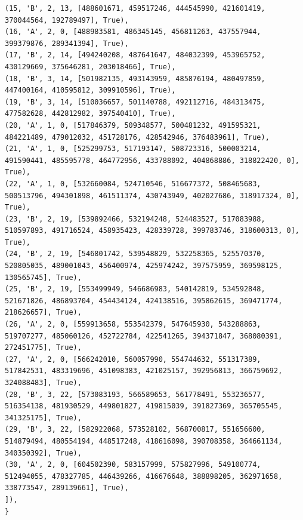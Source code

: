 \documentclass[11pt,reqno]{amsart}
\numberwithin{equation}{section}
\theoremstyle{definition}
\begin{document}
\begin{lstlisting}
(15, 'B', 2, 13, [488601671, 459517246, 444545990, 421601419, 370044564, 192789497], True),
(16, 'A', 2, 0, [488983581, 486345145, 456811263, 437557944, 399379876, 289341394], True),
(17, 'B', 2, 14, [494240208, 487641647, 484032399, 453965752, 430129669, 375646281, 203018466], True),
(18, 'B', 3, 14, [501982135, 493143959, 485876194, 480497859, 447400164, 410595812, 309910596], True),
(19, 'B', 3, 14, [510036657, 501140788, 492112716, 484313475, 477582628, 442812982, 397540410], True),
(20, 'A', 1, 0, [517846379, 509348577, 500481232, 491595321, 484221489, 479012032, 451728176, 428542946, 376483961], True),
(21, 'A', 1, 0, [525299753, 517193147, 508723316, 500003214, 491590441, 485595778, 464772956, 433788092, 404868886, 318822420, 0], True),
(22, 'A', 1, 0, [532660084, 524710546, 516677372, 508465683, 500513796, 494301898, 461511374, 430743949, 402027686, 318917324, 0], True),
(23, 'B', 2, 19, [539892466, 532194248, 524483527, 517083988, 510597893, 491716524, 458935423, 428339728, 399783746, 318600313, 0], True),
(24, 'B', 2, 19, [546801742, 539548829, 532258365, 525570370, 520805035, 489001043, 456400974, 425974242, 397575959, 369598125, 130565745], True),
(25, 'B', 2, 19, [553499949, 546686983, 540142819, 534592848, 521671826, 486893704, 454434124, 424138516, 395862615, 369471774, 218626657], True),
(26, 'A', 2, 0, [559913658, 553542379, 547645930, 543288863, 519707277, 485060126, 452722784, 422541265, 394371847, 368080391, 272451775], True),
(27, 'A', 2, 0, [566242010, 560057990, 554744632, 551317389, 517842531, 483319696, 451098383, 421025157, 392956813, 366759692, 324088483], True),
(28, 'B', 3, 22, [573083193, 566589653, 561778491, 553236577, 516354138, 481930529, 449801827, 419815039, 391827369, 365705545, 341325175], True),
(29, 'B', 3, 22, [582922068, 573528102, 568700817, 551656600, 514879494, 480554194, 448517248, 418616098, 390708358, 364661134, 340350392], True),
(30, 'A', 2, 0, [604502390, 583157999, 575827996, 549100774, 512494055, 478327785, 446439266, 416676648, 388898205, 362971658, 338773547, 289139661], True),
]),
}


\end{lstlisting}
\end{document}
